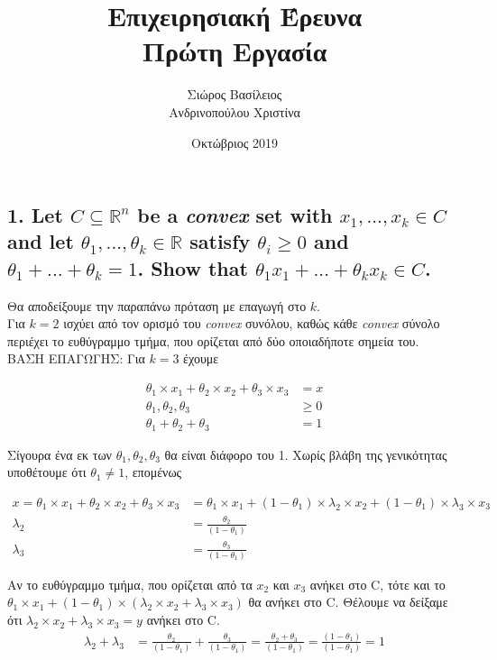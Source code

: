 \documentclass[12pt]{article}
\title{\hugeΑλγοριθμική Επιχειρησιακή Έρευνα\\Πρώτη Εργασία}
\author{Σιώρος Βασίλειος\\Ανδρινοπούλου Χριστίνα}
\date{Οκτώβριος 2019}
\newcommand{\R}{\mathbb{R}}
\begin{document}
\maketitle
\thispagestyle{empty}

\pagebreak


\subsection*{1. Let $C \subseteq \R^n$ be a \textit{convex} set with $x_1 ,..., x_k \in C$ and let $θ_1 , . . . , θ_k \in \R$ satisfy $θ_i \geq 0$ and
$θ_1 +...+ θ_k = 1$. Show that $θ_1x_1 +...+ θ_kx_k \in C$.}

Θα αποδείξουμε την παραπάνω πρόταση με επαγωγή στο $k$.\\

Για $k = 2$ ισχύει από τον ορισμό του \textit{convex} συνόλου,
καθώς κάθε \textit{convex} σύνολο περιέχει το ευθύγραμμο τμήμα, που ορίζεται από δύο οποιαδήποτε σημεία του.\\

ΒΑΣΗ ΕΠΑΓΩΓΗΣ: Για $k = 3$ έχουμε 

\begin{align*}
    θ_1 \times x_1 + θ_2 \times x_2 + θ_3 \times x_3 & = x \\ 
    θ_1, θ_2, θ_3 & \geq 0 \\
    θ_1 + θ_2 + θ_3 & = 1
\end{align*}

Σίγουρα ένα εκ των $θ_1, θ_2, θ_3$ θα είναι διάφορο του 1. Χωρίς βλάβη της γενικότητας υποθέτουμε ότι 
$θ_1 \neq 1$, επομένως

\begin{align*}
    x = θ_1 \times x_1 +  θ_2 \times x_2 + θ_3 \times x_3 & = θ_1 \times x_1 + (1 - θ_1) \times λ_2 \times x_2 + (1 - θ_1) \times λ_3 \times x_3 \\
    λ_2 & = \frac{θ_2}{(1 - θ_1)} \\
    λ_3 & = \frac{θ_3}{(1 - θ_1)}
\end{align*}

Αν το ευθύγραμμο τμήμα, που ορίζεται από τα $x_2$ και $x_3$ ανήκει στο C, τότε και το 
$θ_1 \times x_1 + (1 - θ_1) \times (λ_2 \times x_2 + λ_3 \times x_3)$ θα ανήκει στο C. Θέλουμε να δείξαμε ότι $λ_2 \times x_2 + λ_3 \times x_3 = y$ ανήκει στο C. \\

\begin{align*}
    λ_2 + λ_3 & = \frac{θ_2}{(1 - θ_1)} + \frac{θ_3}{(1 - θ_1)} = \frac{θ_2 + θ_3}{(1 - θ_1)} = \frac{(1 - θ_1)}{(1 - θ_1)} = 1
\end{align*}
\end{document}
